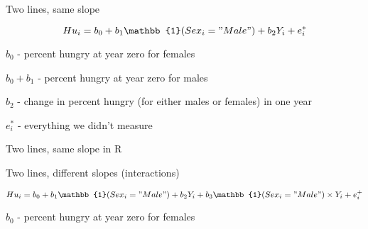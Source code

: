 \documentclass[12pt,openright,oneside,a4paper,chapter=TITLE,section=TITLE,subsection=Title,english,french,spanish,portugues,sumario=tradicional]{04-class-files/abntex2}
\newenvironment{Shaded}{\begin{snugshade}}{\end{snugshade}}
\newcommand{\DataTypeTok}[1]{\textcolor[rgb]{0.13,0.29,0.53}{#1}}
\newcommand{\DecValTok}[1]{\textcolor[rgb]{0.00,0.00,0.81}{#1}}
\newcommand{\KeywordTok}[1]{\textcolor[rgb]{0.13,0.29,0.53}{\textbf{#1}}}
\newcommand{\NormalTok}[1]{#1}
\newcommand{\OperatorTok}[1]{\textcolor[rgb]{0.81,0.36,0.00}{\textbf{#1}}}
\newcommand{\StringTok}[1]{\textcolor[rgb]{0.31,0.60,0.02}{#1}}
\begin{document}
Two lines, same slope

\[Hu_i = b_0 + b_1 \mathbb{1}(Sex_i="Male") + b_2 Y_i + e^*_i\]

\(b_0\) - percent hungry at year zero for females

\(b_0 + b_1\) - percent hungry at year zero for males

\(b_2\) - change in percent hungry (for either males or females) in one year

\(e^*_i\) - everything we didn't measure

Two lines, same slope in R

\begin{Shaded}
\end{Shaded}

Two lines, different slopes (interactions)

\[Hu_i = b_0 + b_1 \mathbb{1}(Sex_i="Male") + b_2 Y_i + b_3 \mathbb{1}(Sex_i="Male")\times Y_i + e^+_i\]

\(b_0\) - percent hungry at year zero for females
\end{document}
